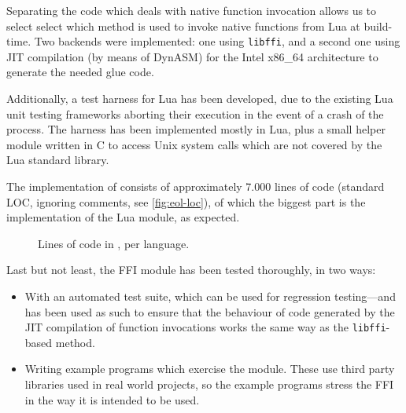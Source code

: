 Separating the code which deals with native function invocation allows us to
select select which method is used to invoke native functions from Lua at
build-time. Two backends were implemented: one using \verb|libffi|, and
a second one using JIT compilation (by means of DynASM) for the Intel x86\_64
architecture to generate the needed glue code.

Additionally, a test harness for Lua has been developed, due to the existing
Lua unit testing frameworks aborting their execution in the event of a crash
of the process. The harness has been implemented mostly in Lua, plus a small
helper module written in C to access Unix system calls which are not covered
by the Lua standard library.

The implementation of \Eol* consists of approximately 7.000  lines of code (standard LOC, ignoring comments, see
\autoref{fig:eol-loc}), of which the biggest part is the implementation of the
\Eol* Lua module, as expected.

\begin{figure}[ht]
	\centering
	\caption{Lines of code in \Eol*, per language.}
	\label{fig:eol-loc}
\end{figure}

Last but not least, the \Eol* FFI module has been tested thoroughly, in two
ways:

\begin{itemize}

	\item With an automated test suite, which can be used for regression
	testing—and has been used as such to ensure that the behaviour of code
	generated by the JIT compilation of function invocations works the same
	way as the \verb|libffi|-based method.

	\item Writing example programs which exercise the module. These use third
	party libraries used in real world projects, so the example programs
	stress the FFI in the way it is intended to be used.

\end{itemize}

